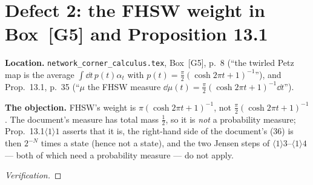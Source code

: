 \documentclass[11pt]{article}
\newcommand{\doc}{\texttt{network\_corner\_calculus.tex}}
\theoremstyle{definition}\newtheorem{example}[theorem]{Example}
\begin{document}
\section{Defect 2: the FHSW weight in Box~[G5] and Proposition 13.1}\label{sec:d2}

\textbf{Location.}  \doc, Box~[G5], p.~8 (``the twirled Petz map is the average
$\int\dd t\,p(t)\alpha_t$ with $p(t)=\frac\pi2(\cosh2\pi t+1)^{-1}$''), and Prop.~13.1,
p.~35 (``$\mu$ the FHSW measure $\dd\mu(t)=\frac\pi2(\cosh2\pi t+1)^{-1}\dd t$'').

\textbf{The objection.}  FHSW's weight is $\pi(\cosh2\pi t+1)^{-1}$, not
$\frac\pi2(\cosh2\pi t+1)^{-1}$.  The document's measure has total mass $\frac12$, so it
is \emph{not} a probability measure; Prop.~13.1$\langle1\rangle1$ asserts that it is, the
right-hand side of the document's (36) is then $2^{-N}$ times a state (hence not a state),
and the two Jensen steps of $\langle1\rangle3$--$\langle1\rangle4$ --- both of which need
a probability measure --- do not apply.

\begin{proof}[Verification]
 
\end{proof}
\end{document}
